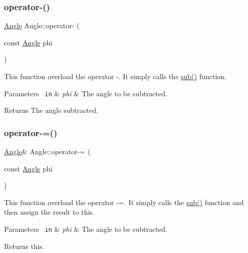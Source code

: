 \subsubsection{\texorpdfstring{operator-\/()}{operator-()}}
{\footnotesize\ttfamily \mbox{\hyperlink{class_angle}{Angle}} Angle\+::operator-\/ (\begin{DoxyParamCaption}\item[{const \mbox{\hyperlink{class_angle}{Angle}}}]{phi }\end{DoxyParamCaption})\hspace{0.3cm}{\ttfamily [inline]}}

This function overload the operator -\/. It simply calls the {\ttfamily \mbox{\hyperlink{class_angle_a74797d883c7a00259f49a9e5dea01c0d}{sub()}}} function. 
\begin{DoxyParams}[1]{Parameters}
\mbox{\texttt{ in}}  & {\em phi} & The angle to be subtracted. \\
\hline
\end{DoxyParams}
\begin{DoxyReturn}{Returns}
The angle subtracted. 
\end{DoxyReturn}
\mbox{\label{class_angle_a54a5489837c16a15320f9249d2cabed6}} 
\subsubsection{\texorpdfstring{operator-\/=()}{operator-=()}}
{\footnotesize\ttfamily \mbox{\hyperlink{class_angle}{Angle}}\& Angle\+::operator-\/= (\begin{DoxyParamCaption}\item[{const \mbox{\hyperlink{class_angle}{Angle}}}]{phi }\end{DoxyParamCaption})\hspace{0.3cm}{\ttfamily [inline]}}

This function overload the operator -\/=. It simply calls the {\ttfamily \mbox{\hyperlink{class_angle_a74797d883c7a00259f49a9e5dea01c0d}{sub()}}} function and then assign the result to this. 
\begin{DoxyParams}[1]{Parameters}
\mbox{\texttt{ in}}  & {\em phi} & The angle to be subtracted. \\
\hline
\end{DoxyParams}
\begin{DoxyReturn}{Returns}
{\ttfamily this}. 
\end{DoxyReturn}
\mbox{\label{class_angle_ac72a246e3e3fd5f1c58d2fd89338b1ff}} 
